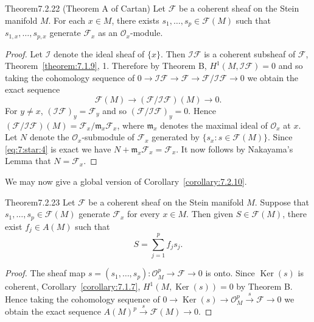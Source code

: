 \begin{originaltheorem}{Theorem}{7.2.22 (Theorem A of Cartan)}
Let $\mathcal F$ be a coherent sheaf on the Stein manifold $M$. For each $x\in M$, there exists $s_1,\ldots,s_p\in\mathcal F(M)$ such that $s_{1,x},\ldots,s_{p,x}$ generate $\mathcal F_x$ as an $\mathcal O_x$-module.
\end{originaltheorem}
\begin{proof}
Let $\mathcal I$ denote the ideal sheaf of $\{x\}$. Then $\mathcal I\mathcal F$ is a coherent subsheaf of $\mathcal F$, Theorem~\ref{theorem:7.1.9}, 1. Therefore by Theorem B, $H^1(M,\mathcal I\mathcal F)=0$ and so taking the cohomology sequence of $0\to\mathcal I\mathcal F\to\mathcal F\to\mathcal F/\mathcal I\mathcal F\to0$ we obtain the exact sequence
\[
\mathcal F(M)\to(\mathcal F/\mathcal I\mathcal F)(M)\to0.\tag{*}\label{eq:7:star:4}
\]
For $y\ne x$, $(\mathcal I\mathcal F)_y=\mathcal F_y$ and so $(\mathcal F/\mathcal I\mathcal F)_y=0$. Hence $(\mathcal F/\mathcal I\mathcal F)(M)=\mathcal F_x/\mathfrak m_x\mathcal F_x$, where $\mathfrak m_x$ denotes the maximal ideal of $\mathcal O_x$ at $x$. Let $N$ denote the $\mathcal O_x$-submodule of $\mathcal F_x$ generated by $\{s_x:s\in\mathcal F(M)\}$. Since \eqref{eq:7:star:4} is exact we have $N+\mathfrak m_x\mathcal F_x=\mathcal F_x$. It now follows by Nakayama's Lemma that $N=\mathcal F_x$.
\end{proof}
We may now give a global version of Corollary~\ref{corollary:7.2.10}.
\begin{originaltheorem}{Theorem}{7.2.23}
Let $\mathcal F$ be a coherent sheaf on the Stein manifold $M$. Suppose that $s_1,\ldots,s_p\in\mathcal F(M)$ generate $\mathcal F_x$ for every $x\in M$. Then given $S\in\mathcal F(M)$, there exist $f_j\in A(M)$ such that
\[
S=\sum_{j=1}^p f_js_j.
\]
\end{originaltheorem}
\begin{proof}
The sheaf map $s=(s_1,\ldots,s_p):\mathcal O_M^p\to\mathcal F\to0$ is onto. Since $\operatorname{Ker}(s)$ is coherent, Corollary~\ref{corollary:7.1.7}, $H^1(M,\operatorname{Ker}(s))=0$ by Theorem B. Hence taking the cohomology sequence of $0\to\operatorname{Ker}(s)\to\mathcal O_M^p\xrightarrow{s}\mathcal F\to0$ we obtain the exact sequence $A(M)^p\xrightarrow{s}\mathcal F(M)\to0$.
\end{proof}

